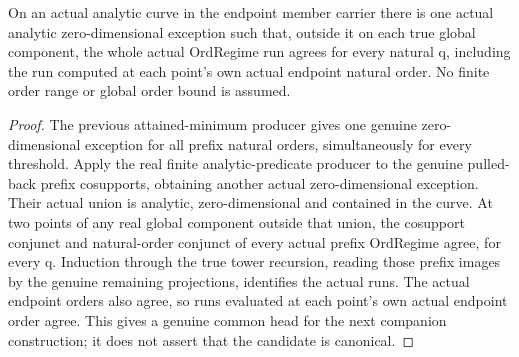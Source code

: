 \begin{lemma}
\label{hir:member-companion-actual-component-run-history}
\leanok
On an actual analytic curve in the endpoint member carrier there is one actual
analytic zero-dimensional exception such that, outside it on each true global
component, the whole actual OrdRegime run agrees for every natural q, including
the run computed at each point's own actual endpoint natural order.
No finite order range or global order bound is assumed.
\end{lemma}
\begin{proof}
The previous attained-minimum producer gives one genuine zero-dimensional
exception for all prefix natural orders, simultaneously for every threshold.
Apply the real finite analytic-predicate producer to the genuine pulled-back
prefix cosupports, obtaining another actual zero-dimensional exception.
Their actual union is analytic, zero-dimensional and contained in the curve.
At two points of any real global component outside that union, the cosupport
conjunct and natural-order conjunct of every actual prefix OrdRegime agree,
for every q. Induction through the true tower recursion, reading those prefix
images by the genuine remaining projections, identifies the actual runs.
The actual endpoint orders also agree, so runs evaluated at each point's own
actual endpoint order agree. This gives a genuine common head for the next
companion construction; it does not assert that the candidate is canonical.
\end{proof}

